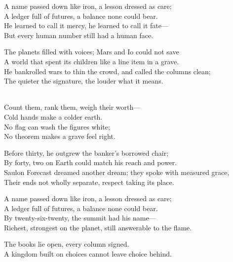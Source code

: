 \begin{lyrics}
A name passed down like iron, a lesson dressed as care;\\
A ledger full of futures, a balance none could bear.\\
He learned to call it mercy, he learned to call it fate—\\
But every human number still had a human face.

The planets filled with voices; Mars and Io could not save\\
A world that spent its children like a line item in a grave.\\
He bankrolled wars to thin the crowd, and called the columns clean;\\
The quieter the signature, the louder what it means.

\\
Count them, rank them, weigh their worth—\\
Cold hands make a colder earth.\\
No flag can wash the figures white;\\
No theorem makes a grave feel right.

Before thirty, he outgrew the banker’s borrowed chair;\\
By forty, two on Earth could match his reach and power.\\
Saulon Forecast dreamed another dream; they spoke with measured grace,\\
Their ends not wholly separate, respect taking its place.

A name passed down like iron, a lesson dressed as care;\\
A ledger full of futures, a balance none could bear.\\
By twenty-six-twenty, the summit had his name—\\
Richest, strongest on the planet, still answerable to the flame.

The books lie open, every column signed.\\
A kingdom built on choices cannot leave choice behind.
\end{lyrics}

